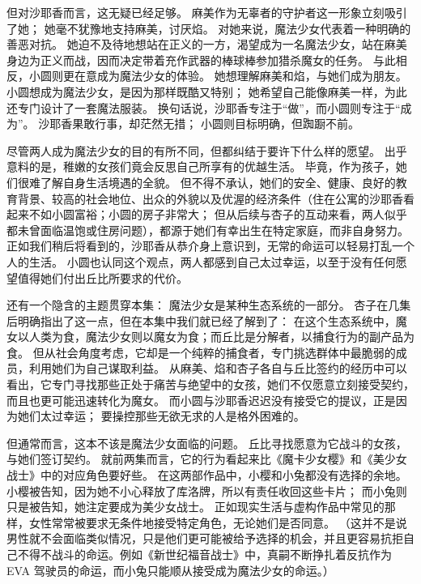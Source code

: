 但对沙耶香而言，这无疑已经足够。
麻美作为无辜者的守护者这一形象立刻吸引了她；
她毫不犹豫地支持麻美，讨厌焰。
对她来说，魔法少女代表着一种明确的善恶对抗。
她迫不及待地想站在正义的一方，渴望成为一名魔法少女，站在麻美身边为正义而战，因而决定带着充作武器的棒球棒参加猎杀魔女的任务。
与此相反，小圆则更在意成为魔法少女的体验。
她想理解麻美和焰，与她们成为朋友。
小圆想成为魔法少女，是因为那样既酷又特别；
她希望自己能像麻美一样，为此还专门设计了一套魔法服装。
换句话说，沙耶香专注于“做”，而小圆则专注于“成为”。
沙耶香果敢行事，却茫然无措；
小圆则目标明确，但踟蹰不前。

尽管两人成为魔法少女的目的有所不同，但都纠结于要许下什么样的愿望。
出乎意料的是，稚嫩的女孩们竟会反思自己所享有的优越生活。
毕竟，作为孩子，她们很难了解自身生活境遇的全貌。
但不得不承认，她们的安全、健康、良好的教育背景、较高的社会地位、出众的外貌以及优渥的经济条件（住在公寓的沙耶香看起来不如小圆富裕；小圆的房子非常大；
但从后续与杏子的互动来看，两人似乎都未曾面临温饱或住房问题），都源于她们有幸出生在特定家庭，而非自身努力。
正如我们稍后将看到的，沙耶香从恭介身上意识到，无常的命运可以轻易打乱一个人的生活。
小圆也认同这个观点，两人都感到自己太过幸运，以至于没有任何愿望值得她们付出丘比所要求的代价。

还有一个隐含的主题贯穿本集：
魔法少女是某种生态系统的一部分。
杏子在几集后明确指出了这一点，但在本集中我们就已经了解到了：
在这个生态系统中，魔女以人类为食，魔法少女则以魔女为食；而丘比是分解者，以捕食行为的副产品为食。
但从社会角度考虑，它却是一个纯粹的捕食者，专门挑选群体中最脆弱的成员，利用她们为自己谋取利益。
从麻美、焰和杏子各自与丘比签约的经历中可以看出，它专门寻找那些正处于痛苦与绝望中的女孩，她们不仅愿意立刻接受契约，而且也更可能迅速转化为魔女。
而小圆与沙耶香迟迟没有接受它的提议，正是因为她们太过幸运；
要操控那些无欲无求的人是格外困难的。

但通常而言，这本不该是魔法少女面临的问题。
丘比寻找愿意为它战斗的女孩，与她们签订契约。
就前两集而言，它的行为看起来比《魔卡少女樱》和《美少女战士》中的对应角色要好些。
在这两部作品中，小樱和小兔都没有选择的余地。
小樱被告知，因为她不小心释放了库洛牌，所以有责任收回这些卡片\cite{ref11}；
而小兔则只是被告知，她注定要成为美少女战士。
正如现实生活与虚构作品中常见的那样，女性常常被要求无条件地接受特定角色，无论她们是否同意\cite{ref22}。
（这并不是说男性就不会面临类似情况，只是他们更可能被给予选择的机会，并且更容易抗拒自己不得不战斗的命运。例如《新世纪福音战士》中，真嗣不断挣扎着反抗作为 EVA 驾驶员的命运，而小兔只能顺从接受成为魔法少女的命运。）

